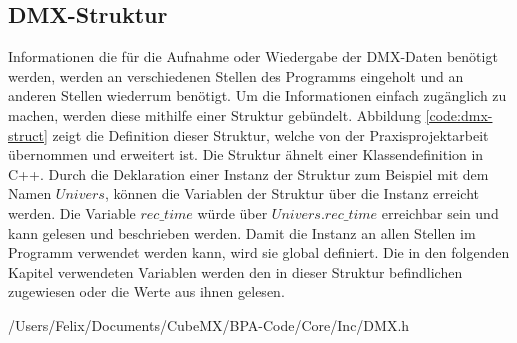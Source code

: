 
\subsection{DMX-Struktur}
\label{sec:dmx_struct}
Informationen die für die Aufnahme oder Wiedergabe der DMX-Daten benötigt werden, werden an verschiedenen Stellen des Programms eingeholt und an anderen Stellen wiederrum benötigt. Um die Informationen einfach zugänglich zu machen, werden diese mithilfe einer Struktur gebündelt. Abbildung \ref{code:dmx-struct} zeigt die Definition dieser Struktur, welche von der Praxisprojektarbeit übernommen und erweitert ist. Die Struktur ähnelt einer Klassendefinition in C++. Durch die Deklaration einer Instanz der Struktur zum Beispiel mit dem Namen $Univers$, können die Variablen der Struktur über die Instanz erreicht werden. Die Variable $rec\_time$ würde über $Univers.rec\_time$ erreichbar sein und kann gelesen und beschrieben werden. Damit die Instanz an allen Stellen im Programm verwendet werden kann, wird sie global definiert. Die in den folgenden Kapitel verwendeten Variablen werden den in dieser Struktur befindlichen zugewiesen oder die Werte aus ihnen gelesen.

{/Users/Felix/Documents/CubeMX/BPA-Code/Core/Inc/DMX.h}
